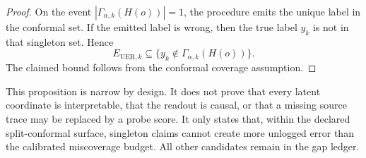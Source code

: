 \begin{proof}
On the event $|\Gamma_{\alpha,k}(H(o))|=1$, the procedure emits the unique
label in the conformal set.  If the emitted label is wrong, then the true label
$y_k$ is not in that singleton set.  Hence
$$
  E_{\mathrm{UER},k}
  \subseteq
  \{
    y_k \notin \Gamma_{\alpha,k}(H(o))
  \}.
$$
The claimed bound follows from the conformal coverage assumption.
\end{proof}

This proposition is narrow by design.  It does not prove that every latent
coordinate is interpretable, that the readout is causal, or that a missing
source trace may be replaced by a probe score.  It only states that, within
the declared split-conformal surface, singleton claims cannot create more
unlogged error than the calibrated miscoverage budget.  All other candidates
remain in the gap ledger.
